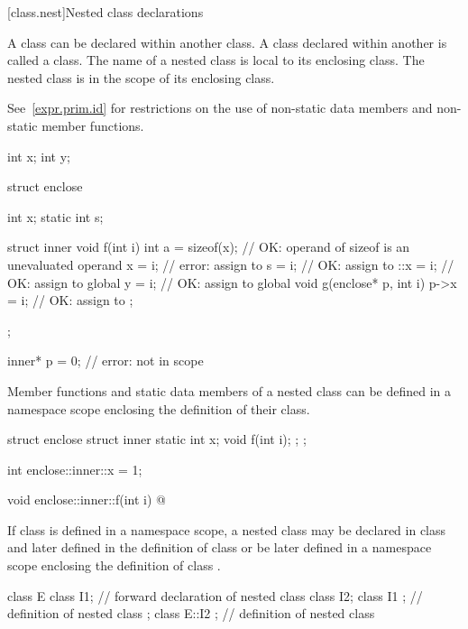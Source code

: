 [class.nest]{Nested class declarations}%
%

\pnum
A class can be declared within another class. A class declared within
another is called a  class. The name of a nested class
is local to its enclosing class.
%
The nested class is in the scope of its enclosing class.
\begin{note}
See~\ref{expr.prim.id} for restrictions on the use of non-static data
members and non-static member functions.
\end{note}

\begin{example}
\begin{codeblock}
int x;
int y;

struct enclose {
  int x;
  static int s;

  struct inner {
    void f(int i) {
      int a = sizeof(x);        // OK: operand of sizeof is an unevaluated operand
      x = i;                    // error: assign to 
      s = i;                    // OK: assign to 
      ::x = i;                  // OK: assign to global 
      y = i;                    // OK: assign to global 
    }
    void g(enclose* p, int i) {
      p->x = i;                 // OK: assign to 
    }
  };
};

inner* p = 0;                   // error:  not in scope
\end{codeblock}
\end{example}

\pnum
Member functions and static data members of a nested class can be
defined in a namespace scope enclosing the definition of their class.
\begin{example}
\begin{codeblock}
struct enclose {
  struct inner {
    static int x;
    void f(int i);
  };
};

int enclose::inner::x = 1;

void enclose::inner::f(int i) { @\commentellip@ }
\end{codeblock}
\end{example}

\pnum
If class  is defined in a namespace scope, a nested class
 may be declared in class  and later defined in the
definition of class  or be later defined in a namespace scope
enclosing the definition of class .
\begin{example}
\begin{codeblock}
class E {
  class I1;                     // forward declaration of nested class
  class I2;
  class I1 { };                 // definition of nested class
};
class E::I2 { };                // definition of nested class
\end{codeblock}
\end{example}

